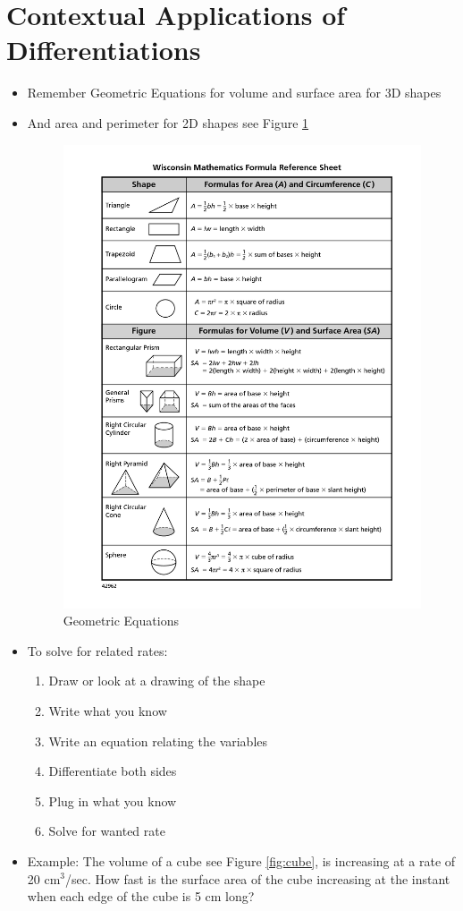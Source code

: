 \documentclass{article}
\begin{document}
\section{Contextual Applications of Differentiations}
\begin{itemize}
    \item Remember Geometric Equations for volume and surface area for 3D shapes
    \item And area and perimeter for 2D shapes see Figure \ref{fig:geometricEquations}
    \begin{figure}[h]
        \centering
        \includegraphics[width=0.5\linewidth]{images/Geometric Equations.png}
        \caption{Geometric Equations}
        \label{fig:geometricEquations}
    \end{figure}
    \item To solve for related rates:
    \begin{enumerate}
        \item Draw or look at a drawing of the shape
        \item Write what you know
        \item Write an equation relating the variables
        \item Differentiate both sides
        \item Plug in what you know
        \item Solve for wanted rate
    \end{enumerate}
    \item Example: The volume of a cube see Figure \ref{fig:cube}, is increasing at a rate of 20 cm$^3$/sec. How fast is the surface area of the cube increasing at the instant when each edge of the cube is 5 cm long?
    \begin{enumerate}

\end{enumerate}
\end{itemize}
\end{document}
